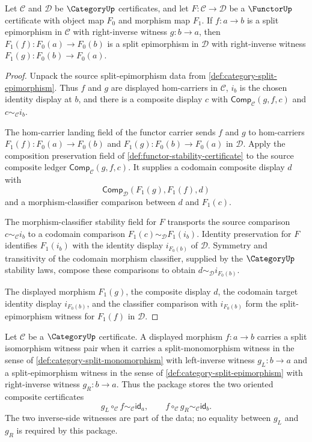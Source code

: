 \begin{theorem}
\label{thm:functor-preserves-split-epimorphism}
Let $\mathcal C$ and $\mathcal D$ be $\CategoryUp$ certificates, and let
$F:\mathcal C\to\mathcal D$ be a $\FunctorUp$ certificate with object map
$F_0$ and morphism map $F_1$. If $f:a\to b$ is a split epimorphism in
$\mathcal C$ with right-inverse witness $g:b\to a$, then
$F_1(f):F_0(a)\to F_0(b)$ is a split epimorphism in $\mathcal D$ with
right-inverse witness $F_1(g):F_0(b)\to F_0(a)$.
\end{theorem}
\begin{proof}
Unpack the source split-epimorphism data from
\autoref{def:category-split-epimorphism}. Thus $f$ and $g$ are displayed
hom-carriers in $\mathcal C$, $i_b$ is the chosen identity display at $b$, and
there is a composite display $c$ with $\mathsf{Comp}_{\mathcal C}(g,f,c)$ and
$c\sim_{\mathcal C} i_b$.

The hom-carrier landing field of the functor carrier sends $f$ and $g$ to
hom-carriers $F_1(f):F_0(a)\to F_0(b)$ and
$F_1(g):F_0(b)\to F_0(a)$ in $\mathcal D$. Apply the composition preservation
field of \autoref{def:functor-stability-certificate} to the source composite
ledger $\mathsf{Comp}_{\mathcal C}(g,f,c)$. It supplies a codomain composite
display $d$ with
$$
\mathsf{Comp}_{\mathcal D}(F_1(g),F_1(f),d)
$$
and a morphism-classifier comparison between $d$ and $F_1(c)$.

The morphism-classifier stability field for $F$ transports the source
comparison $c\sim_{\mathcal C} i_b$ to a codomain comparison
$F_1(c)\sim_{\mathcal D}F_1(i_b)$. Identity preservation for $F$ identifies
$F_1(i_b)$ with the identity display $i_{F_0(b)}$ of $\mathcal D$. Symmetry and
transitivity of the codomain morphism classifier, supplied by the $\CategoryUp$
stability laws, compose these comparisons to obtain
$d\sim_{\mathcal D} i_{F_0(b)}$.

The displayed morphism $F_1(g)$, the composite display $d$, the codomain target
identity display $i_{F_0(b)}$, and the classifier comparison with
$i_{F_0(b)}$ form the split-epimorphism witness for $F_1(f)$ in $\mathcal D$.
\end{proof}

\begin{definition}
\label{def:category-split-isomorphism-witness-pair}
Let $\mathcal C$ be a $\CategoryUp$ certificate. A displayed morphism
$f:a\to b$ carries a split isomorphism witness pair when it carries a
split-monomorphism witness in the sense of
\autoref{def:category-split-monomorphism} with left-inverse witness
$g_L:b\to a$ and a split-epimorphism witness in the sense of
\autoref{def:category-split-epimorphism} with right-inverse witness
$g_R:b\to a$. Thus the package stores the two oriented composite certificates
$$
g_L\circ_{\mathcal C} f\sim_{\mathcal C}\mathsf{id}_a,
\qquad
f\circ_{\mathcal C} g_R\sim_{\mathcal C}\mathsf{id}_b.
$$
The two inverse-side witnesses are part of the data; no equality between
$g_L$ and $g_R$ is required by this package.
\end{definition}

